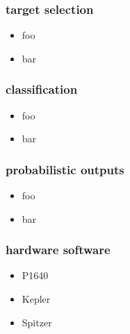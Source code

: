\documentclass[pdftex]{beamer}
\begin{document}
\begin{frame}
  \frametitle{target selection}
  \begin{itemize}
  \item foo
  \item bar
  \end{itemize}
\end{frame}

\begin{frame}
  \frametitle{classification}
  \begin{itemize}
  \item foo
  \item bar
  \end{itemize}
\end{frame}

\begin{frame}
  \frametitle{probabilistic outputs}
  \begin{itemize}
  \item foo
  \item bar
  \end{itemize}
\end{frame}

\begin{frame}
  \frametitle{hardware  software}
  \begin{itemize}
  \item P1640
  \item Kepler
  \item Spitzer
  \end{itemize}
\end{frame}
\end{document}
